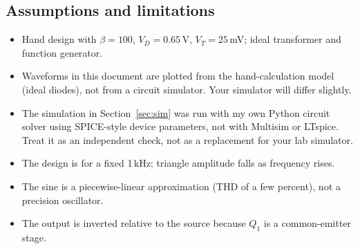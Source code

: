 \subsection*{Assumptions and limitations}
\begin{itemize}
\item Hand design with $\beta=100$, $V_D=0.65$\,V, $V_T=25$\,mV; ideal transformer and function generator.
\item Waveforms in this document are plotted from the hand-calculation model (ideal diodes), not from a circuit simulator. Your simulator will differ slightly.
\item The simulation in Section~\ref{sec:sim} was run with my own Python circuit solver using SPICE-style device parameters, not with Multisim or LTspice. Treat it as an independent check, not as a replacement for your lab simulator.
\item The design is for a fixed 1\,kHz; triangle amplitude falls as frequency rises.
\item The sine is a piecewise-linear approximation (THD of a few percent), not a precision oscillator.
\item The output is inverted relative to the source because $Q_1$ is a common-emitter stage.
\end{itemize}


